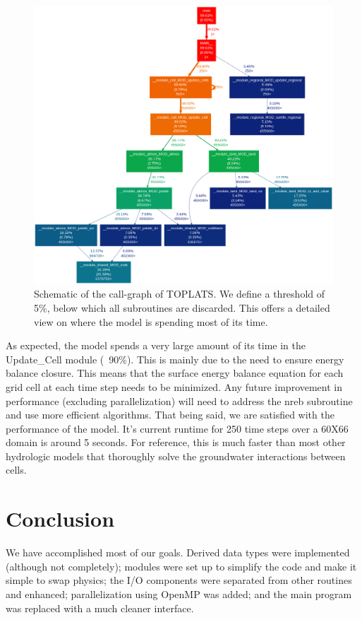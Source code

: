 \documentclass[pdftex,12pt,a4paper]{article}
\begin{document}
\begin{figure}[h]
	\includegraphics[width=5.0in]{Figures/CallGraph.png}

	\caption{Schematic of the call-graph of TOPLATS. We define a threshold of 5\%, below which all subroutines are discarded. This offers a detailed view on where the model is spending most of its time.}
	\label{Profiling1}
\end{figure}

As expected, the model spends a very large amount of its time in the Update\_Cell module (~90\%). This is mainly due to the need to ensure energy balance closure. This means that the surface energy balance equation for each grid cell at each time step needs to be minimized. Any future improvement in performance (excluding parallelization) will need to address the nreb subroutine and use more efficient algorithms. That being said, we are satisfied with the performance of the model. It's current runtime for 250 time steps over a 60X66 domain is around 5 seconds. For reference, this is much faster than most other hydrologic models that thoroughly solve the groundwater interactions between cells.

\section{Conclusion}

We have accomplished most of our goals. Derived data types were implemented (although not completely); modules were set up to simplify the code and make it simple to swap physics; the I/O components were separated from other routines and enhanced; parallelization using OpenMP was added; and the main program was replaced with a much cleaner interface. 
\end{document}
